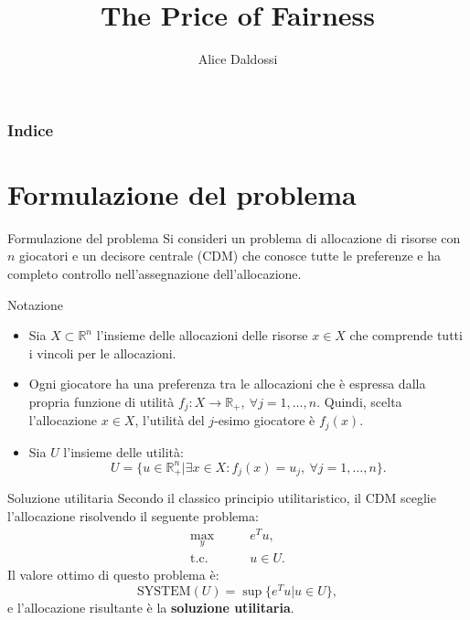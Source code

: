 \documentclass{beamer}
\title{The Price of Fairness}
\author{Alice Daldossi}
\institute{Università degli Studi di Pavia}
\date
\begin{document}
	
	\frame{\titlepage}
	
\begin{frame}
	\frametitle{Indice}
	\tableofcontents
\end{frame}

\section{Formulazione del problema}

\begin{frame}{Formulazione del problema}
	Si consideri un problema di allocazione di risorse con $n$ giocatori e un decisore centrale (CDM) che conosce tutte le preferenze e ha completo controllo nell'assegnazione dell'allocazione. 
	\begin{block}{Notazione}
		\begin{itemize}
			\item Sia $X \subset \mathbb{R}^n$ l'insieme delle allocazioni delle risorse $x \in X$  che comprende tutti i vincoli per le allocazioni.\\
			\item Ogni giocatore ha una preferenza tra le allocazioni che è espressa dalla propria funzione di utilità $f_j: X \rightarrow \mathbb{R}_+, \ \forall j=1,\dots,n.$
			Quindi, scelta l'allocazione $x \in X$, l'utilità del $j$-esimo giocatore è $f_j(x)$.\\
			\item Sia $U$ l'insieme delle utilità: 
			\vspace{-0.3cm}
			\begin{equation*}
				U = \{ u \in \mathbb{R}^n_+ | \exists x \in X: f_j(x) = u_j, \ \forall j=1,\dots,n \}.
			\end{equation*}
		\end{itemize}
		\vspace{-0.4cm}
	\end{block}
\end{frame}

\begin{frame}{Soluzione utilitaria}
	Secondo il classico principio utilitaristico, il CDM sceglie l'allocazione risolvendo il seguente problema:
	\begin{equation}
		\begin{split}
			\underset{y}{\text{max}} & \qquad e^T u, \\
			\text{t.c.} & \qquad u \in U.
		\end{split}
	\end{equation}
	Il valore ottimo di questo problema è:
	\begin{equation}
		\text{SYSTEM}(U) = \sup \{e^T u | u \in U\},
	\end{equation}
	e l'allocazione risultante è la \textbf{soluzione utilitaria}.
\end{frame}
\end{document}
